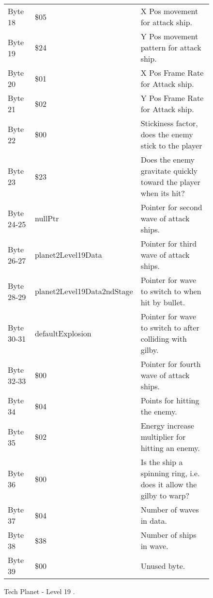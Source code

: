 \begin{figure}[H]
{\begin{adjustbox}{width=12cm}
\begin{tabular}{lll}
 Byte 18    & \$05                        & X Pos movement for attack ship.                                     \\
 Byte 19    & \$24                        & Y Pos movement pattern for attack ship.                             \\
 Byte 20    & \$01                        & X Pos Frame Rate for Attack ship.                                   \\
 Byte 21    & \$02                        & Y Pos Frame Rate for Attack ship.                                   \\
 Byte 22    & \$00                        & Stickiness factor, does the enemy stick to the player               \\
 Byte 23    & \$23                        & Does the enemy gravitate quickly toward the player when its hit?    \\
 Byte 24-25 & nullPtr                    & Pointer for second wave of attack ships.                            \\
 Byte 26-27 & planet2Level19Data         & Pointer for third wave of attack ships.                             \\
 Byte 28-29 & planet2Level19Data2ndStage & Pointer for wave to switch to when hit by bullet.                   \\
 Byte 30-31 & defaultExplosion           & Pointer for  wave to switch to after colliding with gilby.          \\
 Byte 32-33 & \$00                        & Pointer for fourth wave of attack ships.                            \\
 Byte 34    & \$04                        & Points for hitting the enemy.                                       \\
 Byte 35    & \$02                        & Energy increase multiplier for hitting an enemy.                    \\
 Byte 36    & \$00                        & Is the ship a spinning ring, i.e. does it allow the gilby to warp?  \\
 Byte 37    & \$04                        & Number of waves in data.                                            \\
 Byte 38    & \$38                        & Number of ships in wave.                                            \\
 Byte 39    & \$00                        & Unused byte.                                                        \\
\bottomrule
\end{tabular}

  \end{adjustbox}

  }\caption*{Tech Planet - Level 19
.}
\end{figure}

